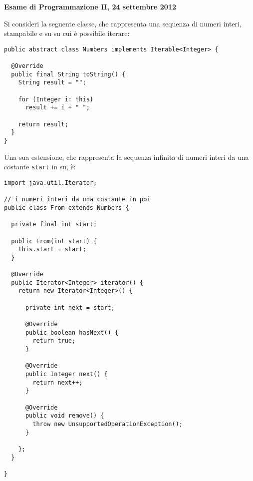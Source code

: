 \documentclass{article}[10pt]
\begin{document}
\begin{center} {\bf Esame di Programmazione II, 24 settembre 2012}\end{center}

Si consideri la seguente classe, che rappresenta una sequenza di numeri interi, stampabile e su su cui \`e
possibile iterare:

{\small
\begin{verbatim}
public abstract class Numbers implements Iterable<Integer> {
  
  @Override
  public final String toString() {
    String result = "";

    for (Integer i: this)
      result += i + " ";

    return result;
  }
}
\end{verbatim}
}

\noindent
Una sua estensione, che rappresenta la sequenza infinita di numeri interi
da una costante \texttt{start} in su, \`e:

{\small
\begin{verbatim}
import java.util.Iterator;

// i numeri interi da una costante in poi
public class From extends Numbers {

  private final int start;

  public From(int start) {
    this.start = start;
  }

  @Override
  public Iterator<Integer> iterator() {
    return new Iterator<Integer>() {

      private int next = start;

      @Override
      public boolean hasNext() {
        return true;
      }

      @Override
      public Integer next() {
        return next++;
      }

      @Override
      public void remove() {
        throw new UnsupportedOperationException();
      }
      
    };
  }

}
\end{verbatim}
}
\end{document}
